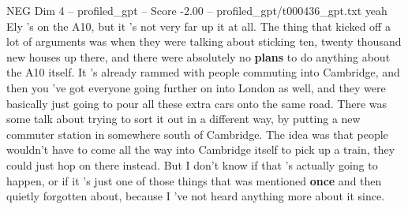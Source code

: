 \begin{textsample}{NEG Dim 4 – profiled\_gpt – Score -2.00 – profiled\_gpt/t000436\_gpt.txt}  \label{ex:f4_neg_017}
yeah Ely ’s on the A10, but it ’s not very far up it at all.
The thing that kicked off a lot of arguments was when they were talking about sticking ten, twenty thousand new houses up there, and there were absolutely no \textbf{plans} to do anything about the A10 itself.
It ’s already rammed with people commuting into Cambridge, and then you ’ve got everyone going further on into London as well, and they were basically just going to pour all these extra cars onto the same road.
There was some talk about trying to sort it out in a different way, by putting a new commuter station in somewhere south of Cambridge.
The idea was that people wouldn't have to come all the way into Cambridge itself to pick up a train, they could just hop on there instead.
But I don't know if that ’s actually going to happen, or if it ’s just one of those things that was mentioned \textbf{once} and then quietly forgotten about, because I ’ve not heard anything more about it since.

\end{textsample}
